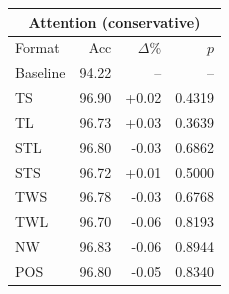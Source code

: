 \begin{tabular}{lrrr}
\toprule
\multicolumn{4}{c}{\textbf{Attention (conservative)}} \\
\midrule
Format & Acc & $\Delta$\% & $p$ \\
\midrule
Baseline & 94.22 & -- & -- \\
\midrule
TS & 96.90 & +0.02 & 0.4319 \\
TL & 96.73 & +0.03 & 0.3639 \\
STL & 96.80 & -0.03 & 0.6862 \\
STS & 96.72 & +0.01 & 0.5000 \\
TWS & 96.78 & -0.03 & 0.6768 \\
TWL & 96.70 & -0.06 & 0.8193 \\
NW & 96.83 & -0.06 & 0.8944 \\
POS & 96.80 & -0.05 & 0.8340 \\
\bottomrule
\end{tabular}